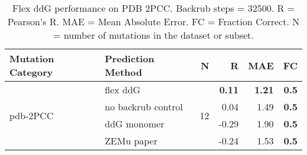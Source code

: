 \begin{table}
  \begin{tabular}{llrrrr}
\toprule
Mutation Category &   Prediction Method &   N &     R &  MAE &  FC \\
\midrule
 \multirow{ 4}{*}{pdb-2PCC} & flex ddG & \multirow{ 4}{*}{12} & \textbf{0.11} & \textbf{1.21} & \textbf{0.5}  \\
 & no backrub control & & 0.04 & 1.49 & \textbf{0.5}  \\
 & ddG monomer & & -0.29 & 1.90 & \textbf{0.5}  \\
 & ZEMu paper & & -0.24 & 1.53 & \textbf{0.5}  \\
\bottomrule
\end{tabular}
  \caption[Flex ddG performance on PDB 2PCC]{
    Flex ddG performance on PDB 2PCC. Backrub steps = 32500. R = Pearson's R. MAE = Mean Absolute Error. FC = Fraction Correct. N = number of mutations in the dataset or subset.
  } \label{tab:table-pdb-2PCC}
\end{table}

